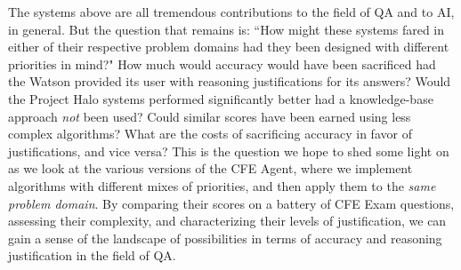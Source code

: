 The systems above are all tremendous contributions to the field of QA and to AI, in general.  But the question that remains is: ``How might these systems fared in either of their respective problem domains had they been designed with different priorities in mind?"  How much would accuracy would have been sacrificed had the Watson provided its user with reasoning justifications for its answers?  Would the Project Halo systems performed significantly better had a knowledge-base approach \emph{not} been used?  Could similar scores have been earned using less complex algorithms?  What are the costs of sacrificing accuracy in favor of justifications, and vice versa?  This is the question we hope to shed some light on as we look at the various versions of the CFE Agent, where we implement algorithms with different mixes of priorities, and then apply them to the \emph{same problem domain}.  By comparing their scores on a battery of CFE Exam questions, assessing their complexity,  and characterizing their levels of justification, we can gain a sense of the landscape of possibilities in terms of accuracy and reasoning justification in the field of QA.









